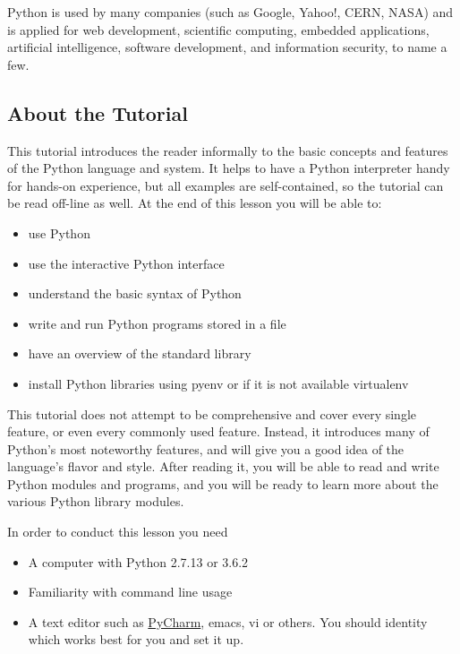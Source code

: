 Python is used by many companies (such as Google, Yahoo!, CERN, NASA)
and is applied for web development, scientific computing, embedded
applications, artificial intelligence, software development, and
information security, to name a few.

\subsection{About the Tutorial}\label{about-the-tutorial}

This tutorial introduces the reader informally to the basic concepts and
features of the Python language and system. It helps to have a Python
interpreter handy for hands-on experience, but all examples are
self-contained, so the tutorial can be read off-line as well. At the end
of this lesson you will be able to:

\begin{itemize}
\tightlist
\item
  use Python
\item
  use the interactive Python interface
\item
  understand the basic syntax of Python
\item
  write and run Python programs stored in a file
\item
  have an overview of the standard library
\item
  install Python libraries using pyenv or if it is not available
  virtualenv
\end{itemize}

This tutorial does not attempt to be comprehensive and cover every
single feature, or even every commonly used feature. Instead, it
introduces many of Python's most noteworthy features, and will give you
a good idea of the language's flavor and style. After reading it, you
will be able to read and write Python modules and programs, and you will
be ready to learn more about the various Python library modules.

In order to conduct this lesson you need

\begin{itemize}
\tightlist
\item
  A computer with Python 2.7.13 or 3.6.2
\item
  Familiarity with command line usage
\item
  A text editor such as
  \href{https://www.jetbrains.com/pycharm/}{PyCharm}, emacs, vi or
  others. You should identity which works best for you and set it up.
\end{itemize}

